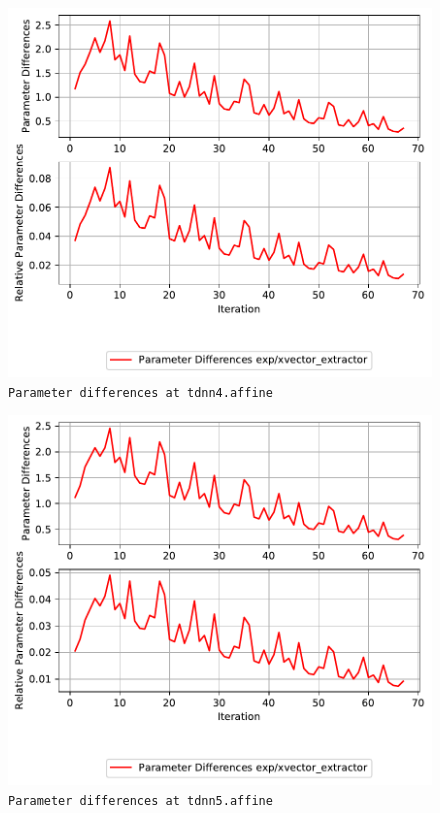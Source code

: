 \documentclass[prl,10pt,twocolumn]{revtex4}
\begin{document}
\newpage
\begin{figure}[h]
  \begin{center}
    \caption{\texttt{Parameter differences at tdnn4.affine}}
    \includegraphics[width=\textwidth]{exp/xvector_extractor/report/param_diff_tdnn4_dot_affine.pdf}
  \end{center}
\end{figure}
\clearpage


\newpage
\begin{figure}[h]
  \begin{center}
    \caption{\texttt{Parameter differences at tdnn5.affine}}
    \includegraphics[width=\textwidth]{exp/xvector_extractor/report/param_diff_tdnn5_dot_affine.pdf}
  \end{center}
\end{figure}
\clearpage
\end{document}
